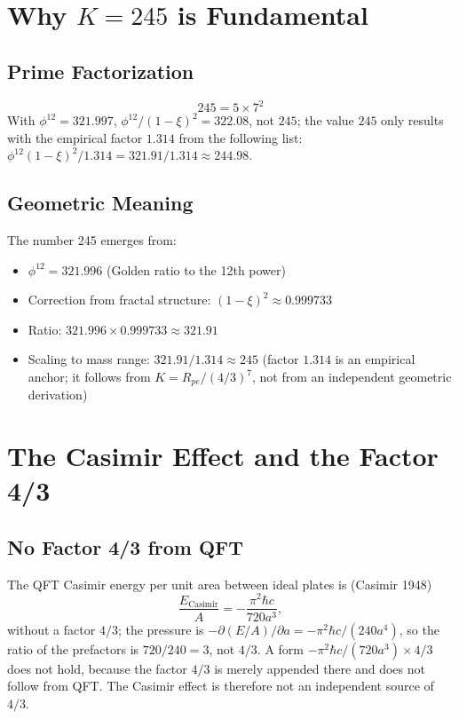 	\section{Why $K = 245$ is Fundamental}
	
	\subsection{Prime Factorization}
	\begin{equation}
		245 = 5 \times 7^2
	\end{equation}
	With $\phi^{12} = 321.997$, $\phi^{12}/(1-\xi)^2 = 322.08$, not $245$; the value $245$ only results with the empirical factor $1.314$ from the following list: $\phi^{12}(1-\xi)^2/1.314 = 321.91/1.314 \approx 244.98$.
	
	\subsection{Geometric Meaning}
	
	The number 245 emerges from:
	\begin{itemize}
		\item $\phi^{12} = 321.996$ (Golden ratio to the 12th power)
		\item Correction from fractal structure: $(1 - \xi)^2 \approx 0.999733$
		\item Ratio: $321.996 \times 0.999733 \approx 321.91$
		\item Scaling to mass range: $321.91/1.314 \approx 245$ (factor $1.314$ is an empirical anchor; it follows from $K = R_{pe}/(4/3)^7$, not from an independent geometric derivation)
	\end{itemize}
	
		\section{The Casimir Effect and the Factor 4/3}

	\subsection{No Factor 4/3 from QFT}

	The QFT Casimir energy per unit area between ideal plates is (Casimir 1948)
	\begin{equation}
		\frac{E_{\text{Casimir}}}{A} = -\frac{\pi^2 \hbar c}{720 a^3},
	\end{equation}
	without a factor $4/3$; the pressure is $-\partial(E/A)/\partial a = -\pi^2\hbar c/(240 a^4)$, so the ratio of the prefactors is $720/240 = 3$, not $4/3$. A form $-\pi^2\hbar c/(720 a^3) \times 4/3$ does not hold, because the factor $4/3$ is merely appended there and does not follow from QFT. The Casimir effect is therefore not an independent source of $4/3$.
	
